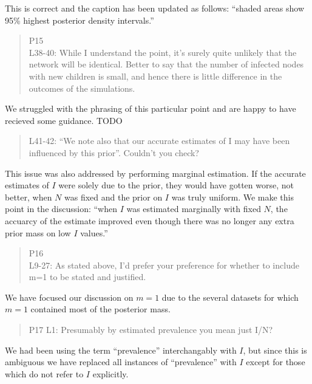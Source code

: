 \documentclass[12pt]{letter}
\begin{document}
\begin{letter}{ }
This is correct and the caption has been updated as follows: ``shaded areas
show 95\% highest posterior density intervals.''

\begin{quote}
  \itshape

  P15 \\
  L38-40: While I understand the point, it’s surely quite unlikely that the
  network will be identical. Better to say that the number of infected nodes
  with new children is small, and hence there is little difference in the
  outcomes of the simulations.
\end{quote}

We struggled with the phrasing of this particular point and are happy to have
recieved some guidance. TODO

\begin{quote}
  \itshape

  L41-42: “We note also that our accurate estimates of I may have been
  influenced by this prior”. Couldn’t you check?
\end{quote}

This issue was also addressed by performing marginal estimation. If the
accurate estimates of $I$ were solely due to the prior, they would have gotten
worse, not better, when $N$ was fixed and the prior on $I$ was truly uniform.
We make this point in the discussion: ``when $I$ was estimated marginally with
fixed $N$, the accuarcy of the estimate improved even though there was no
longer any extra prior mass on low $I$ values.''

\begin{quote}
  \itshape

  P16 \\
  L9-27: As stated above, I'd prefer your preference for whether to include m=1
  to be stated and justified.
\end{quote}

We have focused our discussion on $m = 1$ due to the several datasets for which
$m = 1$ contained most of the posterior mass.

\begin{quote}
  \itshape

  P17
  L1: Presumably by estimated prevalence you mean just I/N?
\end{quote}

We had been using the term ``prevalence'' interchangably with $I$, but since
this is ambiguous we have replaced all instances of ``prevalence'' with $I$
except for those which do not refer to $I$ explicitly.


\end{letter}
\end{document}
